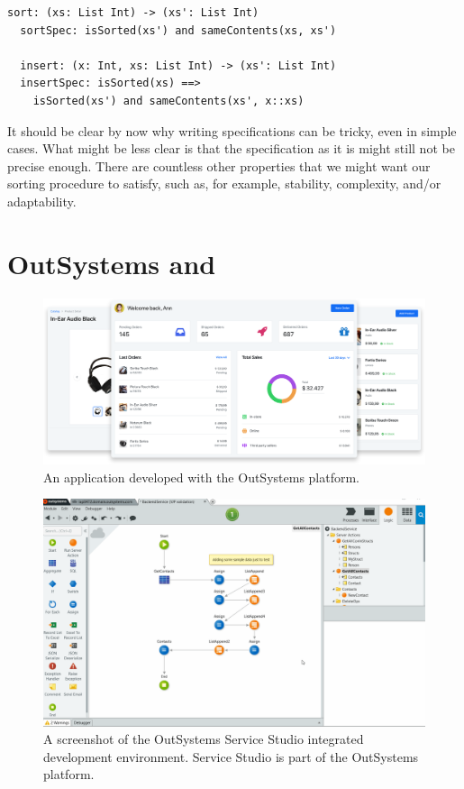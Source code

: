 \begin{lstlisting}[xleftmargin=.2\textwidth]
  sort: (xs: List Int) -> (xs': List Int)
  sortSpec: isSorted(xs') and sameContents(xs, xs')

  insert: (x: Int, xs: List Int) -> (xs': List Int)
  insertSpec: isSorted(xs) ==>
    isSorted(xs') and sameContents(xs', x::xs)
\end{lstlisting}

It should be clear by now why writing specifications can be tricky, even in
simple cases.
What might be less clear is that the specification as it is might still not be
precise enough.
There are countless other properties that we might want our sorting procedure to
satisfy, such as, for example, stability, complexity, and/or adaptability.

\section{OutSystems and }
\label{sec:outsystems-pbe}

\begin{figure}
  \centering
  \includegraphics[width=1.0\textwidth]{assets/outsystems-app.png}
  \caption{An application developed with the OutSystems platform.}
  \label{fig:outsystems-app}
\end{figure}

\begin{figure}
  \centering
  \includegraphics[width=1.0\textwidth]{assets/outsystems-studio.png}
  \caption{A screenshot of the OutSystems Service Studio integrated development
    environment. Service Studio is part of the OutSystems platform.}
  \label{fig:outsystems-platform}
\end{figure}

